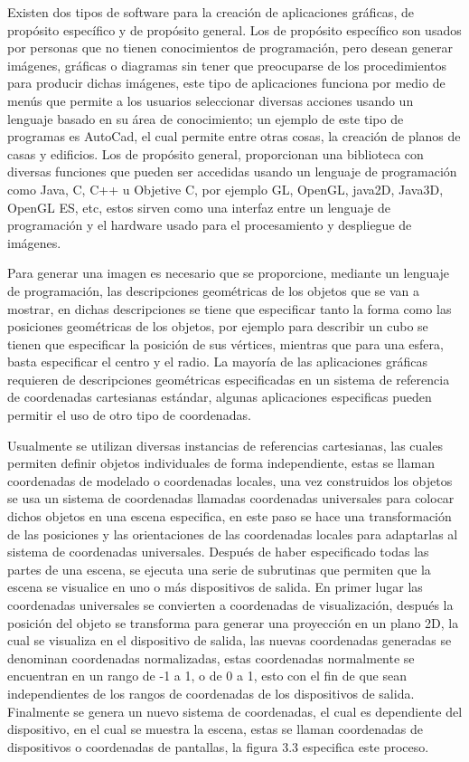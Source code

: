 \documentclass[12pt,a4paper,spanish,openany]{book}
\begin{document}
Existen dos tipos de software para la creación de aplicaciones
gráficas, de propósito específico y de propósito general. Los
de propósito específico son usados por personas que no tienen
conocimientos de programación, pero desean generar imágenes, gráficas o
diagramas sin tener que preocuparse de los procedimientos
para producir dichas imágenes, este tipo de aplicaciones funciona por medio de
menús que permite a los usuarios seleccionar diversas acciones usando un
lenguaje basado en su área de conocimiento; un ejemplo de este tipo de
programas es AutoCad, el cual permite entre otras cosas, la creación de planos
de casas y edificios. Los de propósito general, proporcionan una biblioteca con
diversas funciones que pueden ser accedidas usando un lenguaje de programación
como Java, C, C++ u Objetive C, por ejemplo GL, OpenGL, java2D, Java3D, OpenGL
ES, etc, estos sirven como una interfaz entre un lenguaje de programación y el
hardware usado para el procesamiento y despliegue de imágenes.

Para generar una imagen es necesario que se proporcione, mediante un lenguaje de
programación, las descripciones geométricas de los objetos que se van a mostrar,
en dichas descripciones se tiene que especificar tanto la forma como las
posiciones geométricas de los objetos, por ejemplo para describir un cubo se
tienen que especificar la posición de sus vértices, mientras que para una
esfera, basta especificar el centro y el radio. La mayoría de las aplicaciones
gráficas requieren de descripciones geométricas especificadas en un sistema de
referencia de coordenadas cartesianas estándar, algunas aplicaciones especificas
pueden permitir el uso de otro tipo de coordenadas.

Usualmente se utilizan diversas instancias de referencias cartesianas, las
cuales permiten definir objetos individuales de forma independiente, estas se
llaman coordenadas de modelado o coordenadas locales, una vez construidos los
objetos se usa un sistema de coordenadas llamadas coordenadas universales para
colocar dichos objetos en una escena especifica, en este paso se hace una
transformación de las posiciones y las orientaciones de las  coordenadas
locales para adaptarlas al sistema de coordenadas universales. Después de haber
especificado todas las partes de una escena, se ejecuta una serie de subrutinas
que permiten que la escena se visualice en uno o más dispositivos de
salida. En primer lugar las coordenadas universales se convierten a coordenadas
de visualización, después la posición del objeto se transforma para generar una
proyección en un plano 2D, la cual se visualiza en el dispositivo de salida, las nuevas
coordenadas generadas se denominan coordenadas normalizadas, estas coordenadas
normalmente se encuentran en un rango de -1 a 1, o de 0 a 1, esto con el fin
de que sean independientes de los rangos de coordenadas de los dispositivos de
salida. Finalmente se genera un nuevo sistema de coordenadas, el cual es
dependiente del dispositivo, en el cual se muestra la escena, estas se llaman
coordenadas de dispositivos o coordenadas de pantallas, la figura 3.3
especifica este proceso.
\end{document}
